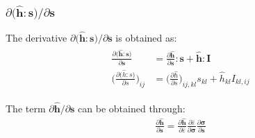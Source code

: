 \documentclass[12pt]{amsart}
\begin{document}
\subsubsection{$\partial\big(\hat{\mathbf{h}}:\mathbf{s}\big)/ \partial\mathbf{s}$ }
\label{sec:3.2.1}


The derivative  $\partial\big(\hat{\mathbf{h}}:\mathbf{s}\big)/ \partial\mathbf{s}$ is obtained as:
\begin{eqnarray}
  \begin{split}
    \label{eq:dphib3}
    \frac{\partial \big(\hat{\mathbf{h}}:\mathbf{s} \big)  } {\partial{\mathbf{s}}} &= \frac{\partial{\hat{\mathbf{h}}}}{\partial{\mathbf{s}}} : \mathbf{s} +\hat{\mathbf{h}}:\mathbf{I}\\
    \bigg(\frac{\partial \big(\hat{h}:s \big)  } {\partial s}\bigg)_{ij} &= \bigg(\frac{\partial\hat{h}}{\partial s}\bigg)_{ij,kl} s_{kl} +\hat{h}_{kl}I_{kl,ij}
  \end{split}
\end{eqnarray}

The term $ \partial\hat{\mathbf{h}}/ \partial\mathbf{s} $ can be obtained through:
\begin{eqnarray}
  \label{eq:dphib4}
\frac{\partial{\hat{\mathbf{h}}}}{\partial{\mathbf{s}}}=\frac{\partial{\hat{\mathbf{h}}}}{\partial{\bar{\varepsilon}}}   \frac{\partial{\bar{\varepsilon}}}{\partial{\mathbf{\sigma}}}    \frac{\partial{\mathbf{\sigma}}}{\partial{\mathbf{s}}}
\end{eqnarray}
\end{document}
